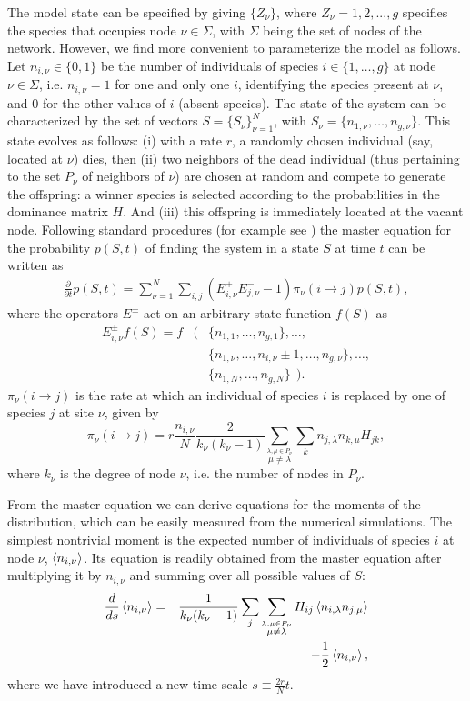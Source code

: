 The model state can be specified by giving $\{Z_\nu\}$, where
$Z_\nu=1,2,...,g$ specifies the species that occupies node
$\nu\in\Sigma$, with $\Sigma$ being the set of nodes of the
network. However, we find more convenient to parameterize the
model as follows. Let $n_{i,\nu}\in \{0,1\}$ be the number of
individuals of species $i\in\{1,\dots,g\}$ at node $\nu\in
\Sigma$, i.e. $n_{i,\nu}=1$ for one and only one $i$,
identifying the species present at $\nu$, and $0$ for the other
values of $i$ (absent species). The state of the system can be
characterized by the set of vectors $S=\{S_\nu\}_{\nu=1}^N$,
with $S_\nu=\{n_{1,\nu},\dots,n_{g,\nu}\}$. This state evolves
as follows: (i) with a rate $r$, a randomly chosen individual
(say, located at $\nu$) dies, then (ii) two neighbors of the
dead individual (thus pertaining to the set $P_\nu$ of
neighbors of $\nu$) are chosen at random and compete to
generate the offspring: a winner species is selected according
to the probabilities in the dominance matrix $H$. And (iii)
this offspring is immediately located at the vacant node.
Following standard procedures (for example see
 \cite{khlohe17,klkh20}) the master equation for the probability
$p(S,t)$ of finding the system in a state $S$ at time $t$ can
be written as
\begin{align}
  \label{eq:me}
  \frac{\partial}{\partial t}p(S,t)=
  \sum_{\nu=1}^N\sum_{i,j}\left( E^+_{i,\nu}E^-_{j,\nu}-1\right)\pi_\nu(i\to j)p(S,t),
\end{align}
where the operators $E^\pm$ act on an arbitrary state function
$f(S)$ as
\begin{eqnarray}
  \nonumber
E^\pm_{i,\nu}f(S)=f&\Big(&\{n_{1,1},\dots,n_{g,1}\} ,\dots, \\   \nonumber
&&\{n_{1,\nu},  \dots,n_{i,\nu}\pm 1,\dots,n_{g,\nu}\},\dots,\\
&&  \{n_{1,N},\dots,n_{g,N}\} \ \ \Big).
\end{eqnarray}
$\pi_{\nu}(i\to j)$ is the rate at which an individual of
species $i$ is replaced by one of species $j$ at site $\nu$,
given by
\begin{equation}
  \pi_{\nu}(i\to j)=r\frac{n_{i,\nu}}{N}\frac{2}{k_\nu(k_\nu-1)}
  \sum_{\stackrel{\lambda,\mu\in P_\nu}{\mu\neq \lambda}}\sum_{k}n_{j,\lambda}n_{k,\mu}H_{jk},
\end{equation}
where $k_\nu$ is the degree of node $\nu$, i.e. the number of
nodes in $P_\nu$. 


From the master equation we can derive equations for the
moments of the distribution, which can be easily measured from
the numerical simulations. The simplest nontrivial moment is
the expected number of individuals of species $i$ at node
$\nu$, $\left\langle n_{i,\nu}\right\rangle$. Its equation is readily obtained
from the master equation after multiplying it by $n_{i,\nu}$
and summing over all possible values of $S$:
\begin{eqnarray}
  \label{eq:ni}
  \frac{d}{ds} \left\langle n_{i,\nu}\right\rangle =&& \frac{1}{k_\nu(k_\nu-1)}
  \sum_{j} \sum_{\stackrel{\lambda,\mu\in P_\nu}{\mu\neq \lambda}}
  H_{ij} \left\langle n_{i,\lambda}n_{j,\mu}\right\rangle\nonumber \\
  && - \frac12 \left\langle n_{i,\nu}\right\rangle ,
\end{eqnarray}
where we have introduced a new time scale $s\equiv
\frac{2r}{N}t$.

